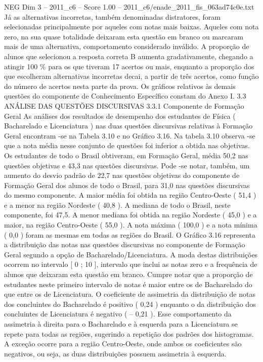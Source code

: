 \begin{textsample}{NEG Dim 3 – 2011\_c6 – Score 1.00 – 2011\_c6/enade\_2011\_fis\_063ad74c0e.txt}
Já as alternativas incorretas, também denominadas distratores, foram selecionadas principalmente por aqueles com notas mais baixas.
Aqueles com nota zero, na sua quase totalidade deixaram esta questão em branco ou marcaram mais de uma alternativa, comportamento considerado inválido.
A proporção de alunos que selecionou a resposta correta B aumenta gradativamente, chegando a atingir 100 \% para os que tiveram 17 acertos ou mais, enquanto a proporção dos que escolheram alternativas incorretas decai, a partir de três acertos, como função do número de acertos nesta parte da prova.
Os gráficos relativos às demais questões do componente de Conhecimento Específico constam do Anexo I. 3.3 ANÁLISE DAS QUESTÕES DISCURSIVAS 3.3.1 Componente de Formação Geral As análises dos resultados de desempenho dos estudantes de Física ( Bacharelado e Licenciatura ) nas duas questões discursivas relativas à Formação Geral encontram -se na Tabela 3.10 e no Gráfico 3.16.
Na tabela 3.10 observa -se que a nota média nesse conjunto de questões foi inferior a obtida nas objetivas.
Os estudantes de todo o Brasil obtiveram, em Formação Geral, média 50,2 nas questões objetivas e 43,3 nas questões discursivas.
Pode -se notar, também, um aumento do desvio padrão de 22,7 nas questões objetivas do componente de Formação Geral dos alunos de todo o Brasil, para 31,0 nas questões discursivas do mesmo componente.
A maior média foi obtida na região Centro-Oeste ( 51,4 ) e a menor na região Nordeste ( 40,8 ).
A mediana de todo o Brasil, neste componente, foi 47,5.
A menor mediana foi obtida na região Nordeste ( 45,0 ) e a maior, na região Centro-Oeste ( 55,0 ).
A nota máxima ( 100,0 ) e a nota mínima ( 0,0 ) foram as mesmas em todas as regiões do Brasil.
O Gráfico 3.16 representa a distribuição das notas nas questões discursivas no componente de Formação Geral segundo a opção de Bacharelado/Licenciatura.
A moda destas distribuições ocorrem no intervalo [ 0 ; 10 ], intervalo que inclui as notas zero e a frequência de alunos que deixaram esta questão em branco.
Cumpre notar que a proporção de estudantes neste primeiro intervalo de notas é maior entre os de Bacharelado do que entre os de Licenciatura.
O coeficiente de assimetria da distribuição de notas dos concluintes do Bacharelado é positivo ( 0,24 ) enquanto o da distribuição dos concluintes de Licenciatura é negativo ( – 0,21 ).
Esse comportamento da assimetria à direita para o Bacharelado e à esquerda para a Licenciatura se repete para todas as regiões, sugerindo a repetição dos padrões dos histogramas.
A exceção ocorre para a região Centro-Oeste, onde ambos os coeficientes são negativos, ou seja, as duas distribuições possuem assimetria à esquerda.

\end{textsample}
